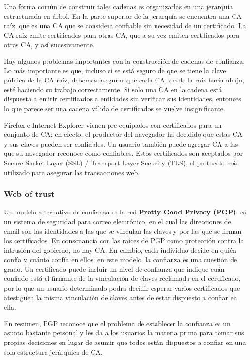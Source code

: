 Una forma común de construir tales cadenas es organizarlas en una jerarquía estructurada en árbol. En la parte superior de la jerarquía se encuentra una CA raíz, que es una CA que se considera confiable sin necesidad de un certificado. La CA raíz emite certificados para otras CA, que a su vez emiten certificados para otras CA, y así sucesivamente. 

Hay algunos problemas importantes con la construcción de cadenas de confianza. Lo más importante es que, incluso si se está seguro de que se tiene la clave pública de la CA raíz, debemos asegurar que cada CA, desde la raíz hacia abajo, esté haciendo su trabajo correctamente. Si solo una CA en la cadena está dispuesta a emitir certificados a entidades sin verificar sus identidades, entonces lo que parece ser una cadena válida de certificados se vuelve insignificante.

Firefox e Internet Explorer vienen pre-equipados con certificados para un conjunto de CA; en efecto, el productor del navegador ha decidido que estas CA y sus claves pueden ser confiables. Un usuario también puede agregar CA a las que su navegador reconoce como confiables. Estos certificados son aceptados por Secure Socket Layer (SSL) / Transport Layer Security (TLS), el protocolo más utilizado para asegurar las transacciones web.

\subsubsection*{Web of trust}
Un modelo alternativo de confianza es la red \textbf{Pretty Good Privacy (PGP)}:  es un sistema de seguridad para correo electrónico, en el cual las direcciones de email son las identidades a las que se vinculan las claves y por las que se firman los certificados. En consonancia con las raíces de PGP como protección contra la intrusión del gobierno, no hay CA. En cambio, cada individuo decide en quién confía y cuánto confía en ellos; en este modelo, la confianza es una cuestión de grado. Un certificado puede incluir un nivel de confianza que indique cuán confiado está el firmante de la vinculación de claves reclamada en el certificado, por lo que un usuario determinado podrá decidir esperar varios certificados que atestigüen la misma vinculación de claves antes de estar dispuesto a confiar en ella.

En resumen, PGP reconoce que el problema de establecer la confianza es un asunto bastante personal y les da a los usuarios la materia prima para tomar sus propias decisiones en lugar de asumir que todos están dispuestos a confiar en una sola estructura jerárquica de CA.

